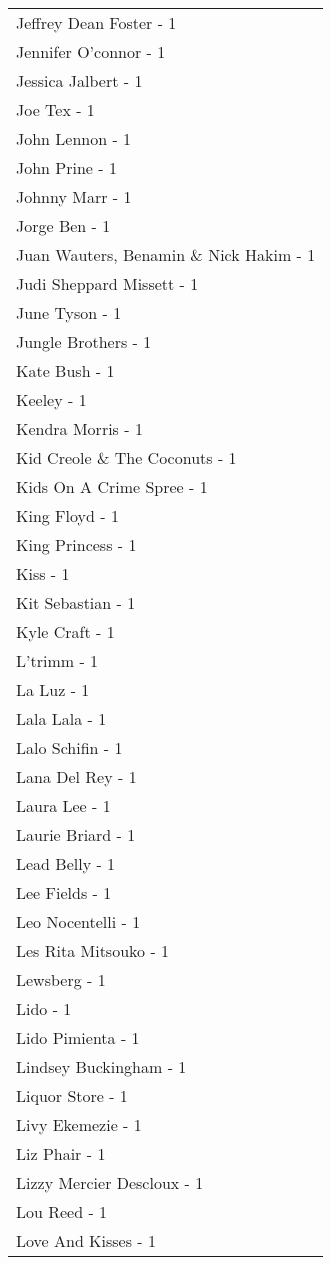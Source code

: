 \documentclass[
]{article}
\begin{document}
\begin{longtable}{l}
Jeffrey Dean Foster - 1 \\ 
Jennifer O'connor - 1 \\ 
Jessica Jalbert - 1 \\ 
Joe Tex - 1 \\ 
John Lennon - 1 \\ 
John Prine - 1 \\ 
Johnny Marr - 1 \\ 
Jorge Ben - 1 \\ 
Juan Wauters, Benamin \& Nick Hakim - 1 \\ 
Judi Sheppard Missett - 1 \\ 
June Tyson - 1 \\ 
Jungle Brothers - 1 \\ 
Kate Bush - 1 \\ 
Keeley - 1 \\ 
Kendra Morris - 1 \\ 
Kid Creole \& The Coconuts - 1 \\ 
Kids On A Crime Spree - 1 \\ 
King Floyd - 1 \\ 
King Princess - 1 \\ 
Kiss - 1 \\ 
Kit Sebastian - 1 \\ 
Kyle Craft - 1 \\ 
L'trimm - 1 \\ 
La Luz - 1 \\ 
Lala Lala - 1 \\ 
Lalo Schifin - 1 \\ 
Lana Del Rey - 1 \\ 
Laura Lee - 1 \\ 
Laurie Briard - 1 \\ 
Lead Belly - 1 \\ 
Lee Fields - 1 \\ 
Leo Nocentelli - 1 \\ 
Les Rita Mitsouko - 1 \\ 
Lewsberg - 1 \\ 
Lido - 1 \\ 
Lido Pimienta - 1 \\ 
Lindsey Buckingham - 1 \\ 
Liquor Store - 1 \\ 
Livy Ekemezie - 1 \\ 
Liz Phair - 1 \\ 
Lizzy Mercier Descloux - 1 \\ 
Lou Reed - 1 \\ 
Love And Kisses - 1 \\ 

\end{longtable}
\end{document}
